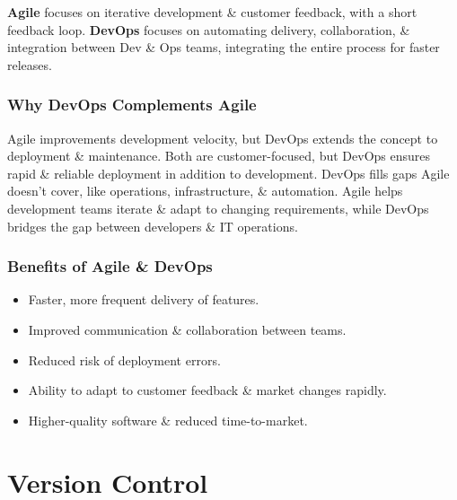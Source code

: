 \documentclass[a4paper,11pt]{article}
\begin{document}
\textbf{Agile} focuses on iterative development \& customer feedback, with a short feedback loop.
\textbf{DevOps} focuses on automating delivery, collaboration, \& integration between Dev \& Ops teams, integrating the entire process for faster releases.

\subsubsection{Why DevOps Complements Agile}
Agile improvements development velocity, but DevOps extends the concept to deployment \& maintenance.
Both are customer-focused, but DevOps ensures rapid \& reliable deployment in addition to development.
DevOps fills gaps Agile doesn't cover, like operations, infrastructure, \& automation.
Agile helps development teams iterate \& adapt to changing requirements, while DevOps bridges the gap between developers \& IT operations.

\subsubsection{Benefits of Agile \& DevOps}
\begin{itemize}
    \item   Faster, more frequent delivery of features.
    \item   Improved communication \& collaboration between teams. 
    \item   Reduced risk of deployment errors.
    \item   Ability to adapt to customer feedback \& market changes rapidly.
    \item   Higher-quality software \& reduced time-to-market.
\end{itemize}
 
\section{Version Control}
\end{document}
